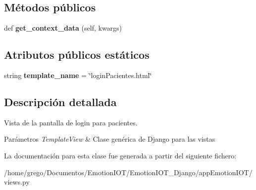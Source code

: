 \subsection*{Métodos públicos}
\begin{DoxyCompactItemize}
\item 
def {\bfseries get\+\_\+context\+\_\+data} (self, kwargs)\hypertarget{classappEmotionIOT_1_1views_1_1LoginPacientes_a58961e2a50add8d0db4d439c5e4c4f8a}{}\label{classappEmotionIOT_1_1views_1_1LoginPacientes_a58961e2a50add8d0db4d439c5e4c4f8a}

\end{DoxyCompactItemize}
\subsection*{Atributos públicos estáticos}
\begin{DoxyCompactItemize}
\item 
string {\bfseries template\+\_\+name} = \char`\"{}login\+Pacientes.\+html\char`\"{}\hypertarget{classappEmotionIOT_1_1views_1_1LoginPacientes_aa85af32cd09484af22b2db4723632d12}{}\label{classappEmotionIOT_1_1views_1_1LoginPacientes_aa85af32cd09484af22b2db4723632d12}

\end{DoxyCompactItemize}


\subsection{Descripción detallada}
Vista de la pantalla de login para pacientes. 


\begin{DoxyParams}{Parámetros}
{\em Template\+View} & Clase genérica de Django para las vistas \\
\hline
\end{DoxyParams}


La documentación para esta clase fue generada a partir del siguiente fichero\+:\begin{DoxyCompactItemize}
\item 
/home/grego/\+Documentos/\+Emotion\+I\+O\+T/\+Emotion\+I\+O\+T\+\_\+\+Django/app\+Emotion\+I\+O\+T/views.\+py\end{DoxyCompactItemize}
